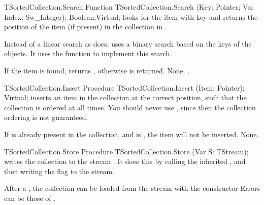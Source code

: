 \html{}


\begin{function}{TSortedCollection.Search}
\Declaration
Function TSortedCollection.Search (Key: Pointer; Var Index: Sw\_Integer): Boolean;Virtual;
\Description
{} looks for the item with key  and returns the position 
of the item (if present) in the collection in .

Instead of a linear search as  does, 
uses a binary search based on the keys of the objects. It uses the
 function to implement this
search. 

If the item is found,  returns , otherwise 
is returned.
\Errors
None.
\SeeAlso
{}.
\end{function}

\html{}

\begin{procedure}{TSortedCollection.Insert}
\Declaration
Procedure TSortedCollection.Insert (Item: Pointer); Virtual;
\Description
{} inserts an item in the collection at the correct position, such
that the collection is ordered at all times. You should never use
, since then the collection ordering
is not guaranteed.

If  is already present in the collection, and  is
, the item will not be inserted.
\Errors
None.
\SeeAlso
{}
\end{procedure}

\html{}

\begin{procedure}{TSortedCollection.Store}
\Declaration
Procedure TSortedCollection.Store (Var S: TStream);
\Description
{} writes the collection to the stream . It does this by
calling the inherited , and then writing the
 flag to the stream.

After a , the collection can be loaded from the stream with the 
constructor 
\Errors
Errors can be those of .
\SeeAlso
{}
\end{procedure}

